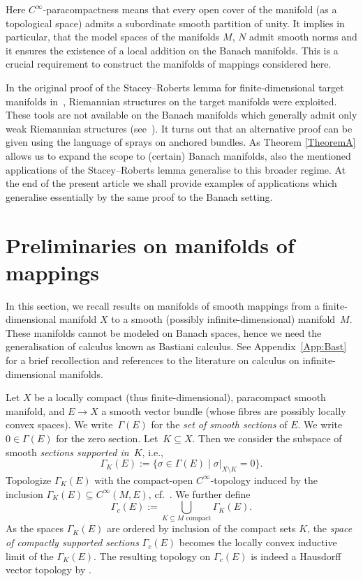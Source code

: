 \documentclass[11pt]{article}
\numberwithin{equation}{section}
\numberwithin{equation}{section}
\newtheorem{setup}[Theorem]{}
\begin{document}
Here $C^\infty$-paracompactness means that every open cover of the manifold (as a topological space) admits a subordinate smooth partition of unity. It implies in particular, that the model spaces of the manifolds $M$, $N$ admit smooth norms and it ensures the existence of a local addition on the Banach manifolds. This is a crucial requirement to construct the manifolds of mappings considered here.

In the original proof of the Stacey--Roberts lemma for finite-dimensional target manifolds in~\cite{AaS19}, Riemannian structures on the target manifolds were exploited. These tools are not available on the Banach manifolds which generally admit only weak Riemannian structures (see~\cite{Sch23}). It turns out that an alternative proof can be given using the language of sprays on anchored bundles. As Theorem \ref{TheoremA} allows us to expand the scope to (certain) Banach manifolds, also the mentioned applications of the Stacey--Roberts lemma generalise to this broader regime. At the end of the present article we shall provide examples of applications which generalise essentially by the same proof to the Banach setting.

\section{Preliminaries on manifolds of mappings}
In this section, we recall results on manifolds of smooth mappings from a finite-dimensional manifold $X$ to a smooth (possibly infinite-dimensional) manifold~$M$. These manifolds cannot be modeled on Banach spaces, hence we need the generalisation of calculus known as Bastiani calculus. See Appendix~\ref{App:Bast}
for a brief recollection and references to the literature on calculus on infinite-dimensional manifolds.

Let $X$ be a locally compact (thus finite-dimensional), paracompact smooth manifold, and ${E \rightarrow X}$ a smooth vector bundle (whose fibres are possibly locally convex spaces).
We write~$\Gamma(E)$ for the \emph{set of smooth sections} of $E$.
We write $0 \in \Gamma(E)$ for the zero section.
Let~${K \subseteq X}$.
Then we consider the subspace of smooth \emph{sections supported in}~$K$, i.e.,
\begin{displaymath}
 \Gamma_{K}(E) := \bigl\{ \sigma \in \Gamma(E) \mid \sigma|_{X \setminus K} = 0 \bigr\}.
\end{displaymath}
Topologize $\Gamma_K(E)$ with the compact-open $C^{\infty}$-topology induced by the inclusion $\Gamma_K(E) \subseteq C^{\infty}(M,E)$, cf.\ \cite{HaS17}.
We further define
\begin{displaymath}
 \Gamma_c (E) := \bigcup_{K \subseteq M \text{ compact}} \Gamma_K (E).
\end{displaymath}
As the spaces $\Gamma_K(E)$ are ordered by inclusion of the compact sets $K$, the \emph{space of compactly supported sections} $\Gamma_c(E)$ becomes the locally convex inductive limit of the $\Gamma_K(E)$. The resulting topology on $\Gamma_c(E)$ is indeed a Hausdorff vector topology by \cite[Lemma F.19\,(c)]{glo04}.
\end{document}
